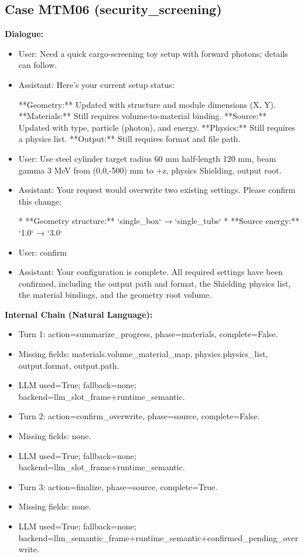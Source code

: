 \documentclass[11pt]{ctexart}
\begin{document}
\subsection{Case MTM06 (security\_screening)}
\textbf{Dialogue:}
\begin{itemize}
\item User: Need a quick cargo-screening toy setup with forward photons; details can follow.
\item Assistant: Here's your current setup status:

**Geometry:** Updated with structure and module dimensions (X, Y).
**Materials:** Still requires volume-to-material binding.
**Source:** Updated with type, particle (photon), and energy.
**Physics:** Still requires a physics list.
**Output:** Still requires format and file path.
\item User: Use steel cylinder target radius 60 mm half-length 120 mm, beam gamma 3 MeV from (0,0,-500) mm to +z, physics Shielding, output root.
\item Assistant: Your request would overwrite two existing settings. Please confirm this change:

*   **Geometry structure:** `single\_box` → `single\_tubs`
*   **Source energy:** `1.0` → `3.0`
\item User: confirm
\item Assistant: Your configuration is complete. All required settings have been confirmed, including the output path and format, the Shielding physics list, the material bindings, and the geometry root volume.
\end{itemize}
\textbf{Internal Chain (Natural Language):}
\begin{itemize}
\item Turn 1: action=summarize\_progress, phase=materials, complete=False.
\item Missing fields: materials.volume\_material\_map, physics.physics\_list, output.format, output.path.
\item LLM used=True; fallback=none; backend=llm\_slot\_frame+runtime\_semantic.
\item Turn 2: action=confirm\_overwrite, phase=source, complete=False.
\item Missing fields: none.
\item LLM used=True; fallback=none; backend=llm\_slot\_frame+runtime\_semantic.
\item Turn 3: action=finalize, phase=source, complete=True.
\item Missing fields: none.
\item LLM used=True; fallback=none; backend=llm\_semantic\_frame+runtime\_semantic+confirmed\_pending\_overwrite.
\end{itemize}
\end{document}
